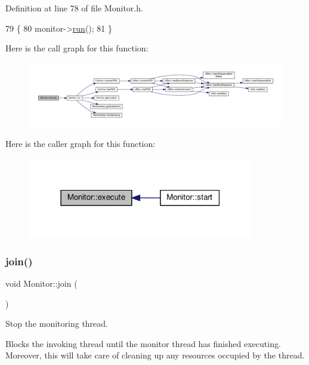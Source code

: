 Definition at line 78 of file Monitor.\+h.


\begin{DoxyCode}
79     \{
80         monitor->\hyperlink{class_monitor_a81666ecd4a8db05fd3090f7e47eca6ed}{run}();
81     \}
\end{DoxyCode}
Here is the call graph for this function\+:
\nopagebreak
\begin{figure}[H]
\begin{center}
\leavevmode
\includegraphics[width=350pt]{d9/df7/class_monitor_a79e0c78d0973bee48418aedf3aedb2ba_cgraph}
\end{center}
\end{figure}
Here is the caller graph for this function\+:
\nopagebreak
\begin{figure}[H]
\begin{center}
\leavevmode
\includegraphics[width=279pt]{d9/df7/class_monitor_a79e0c78d0973bee48418aedf3aedb2ba_icgraph}
\end{center}
\end{figure}
\mbox{\label{class_monitor_a2d2e309666c98333a317c9786f94f6ad}} 
\subsubsection{\texorpdfstring{join()}{join()}}
{\footnotesize\ttfamily void Monitor\+::join (\begin{DoxyParamCaption}{ }\end{DoxyParamCaption})}

Stop the monitoring thread.

Blocks the invoking thread until the monitor thread has finished executing. Moreover, this will take care of cleaning up any resources occupied by the thread. 

